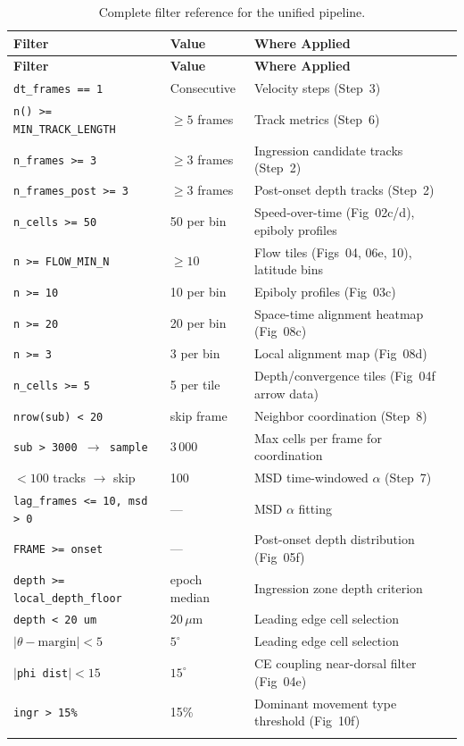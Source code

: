 \documentclass[11pt,a4paper]{article}
\newcommand{\um}{\,\mu\text{m}}
\begin{document}
\begin{longtable}{p{4.5cm} p{3cm} p{7cm}}
\toprule
\textbf{Filter} & \textbf{Value} & \textbf{Where Applied} \\
\midrule
\endfirsthead
\toprule
\textbf{Filter} & \textbf{Value} & \textbf{Where Applied} \\
\midrule
\endhead
\texttt{dt\_frames == 1} & Consecutive & Velocity steps (Step~3) \\
\texttt{n() >= MIN\_TRACK\_LENGTH} & $\ge 5$ frames & Track metrics (Step~6) \\
\texttt{n\_frames >= 3} & $\ge 3$ frames & Ingression candidate tracks (Step~2) \\
\texttt{n\_frames\_post >= 3} & $\ge 3$ frames & Post-onset depth tracks (Step~2) \\
\texttt{n\_cells >= 50} & 50 per bin & Speed-over-time (Fig~02c/d), epiboly profiles \\
\texttt{n >= FLOW\_MIN\_N} & $\ge 10$ & Flow tiles (Figs~04, 06e, 10), latitude bins \\
\texttt{n >= 10} & 10 per bin & Epiboly profiles (Fig~03c) \\
\texttt{n >= 20} & 20 per bin & Space-time alignment heatmap (Fig~08c) \\
\texttt{n >= 3} & 3 per bin & Local alignment map (Fig~08d) \\
\texttt{n\_cells >= 5} & 5 per tile & Depth/convergence tiles (Fig~04f arrow data) \\
\texttt{nrow(sub) < 20} & skip frame & Neighbor coordination (Step~8) \\
\texttt{sub > 3000 $\to$ sample} & 3\,000 & Max cells per frame for coordination \\
$< 100$ tracks $\to$ skip & 100 & MSD time-windowed $\alpha$ (Step~7) \\
\texttt{lag\_frames <= 10, msd > 0} & --- & MSD $\alpha$ fitting \\
\texttt{FRAME >= onset} & --- & Post-onset depth distribution (Fig~05f) \\
\texttt{depth >= local\_depth\_floor} & epoch median & Ingression zone depth criterion \\
\texttt{depth < 20 um} & 20$\um$ & Leading edge cell selection \\
\texttt{$|\theta - \mathrm{margin}| < 5$} & $5^\circ$ & Leading edge cell selection \\
\texttt{$|$phi dist$| < 15$} & $15^\circ$ & CE coupling near-dorsal filter (Fig~04e) \\
\texttt{ingr > 15\%} & 15\% & Dominant movement type threshold (Fig~10f) \\
\bottomrule
\caption{Complete filter reference for the unified pipeline.}
\end{longtable}
\end{document}
